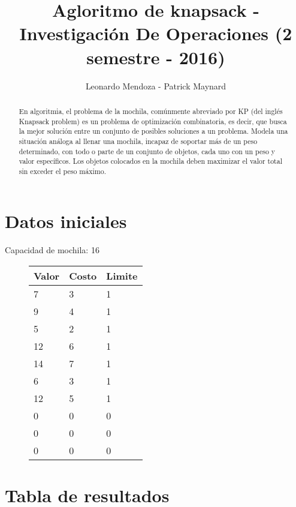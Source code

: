 \documentclass{article}
\begin{document}
\title{Agloritmo de knapsack - Investigación De Operaciones  (2 semestre - 2016)}
\author{Leonardo Mendoza - Patrick Maynard}

\maketitle

\begin{abstract}
En algoritmia, el problema de la mochila, comúnmente abreviado por KP (del inglés Knapsack problem) es un problema de optimización combinatoria, es decir, que busca la mejor solución entre un conjunto de posibles soluciones a un problema. Modela una situación análoga al llenar una mochila, incapaz de soportar más de un peso determinado, con todo o parte de un conjunto de objetos, cada uno con un peso y valor específicos. Los objetos colocados en la mochila deben maximizar el valor total sin exceder el peso máximo.
\end{abstract}

\section{Datos iniciales}


Capacidad de mochila: 16

\centering 
\begin{figure}[H]
\label{my-label2}
\begin{tabular}{|l|l|l|} 
\hline
Valor & Costo  & Limite\\ \hline
 7& 3& 1 \\ \hline
9& 4& 1 \\ \hline
5& 2& 1 \\ \hline
12& 6& 1 \\ \hline
14& 7& 1 \\ \hline
6& 3& 1 \\ \hline
12& 5& 1 \\ \hline
0& 0& 0 \\ \hline
0& 0& 0 \\ \hline
0& 0& 0 \\ \hline

\end{tabular}
\end{figure}

    
\section{Tabla de resultados}
\end{document}
